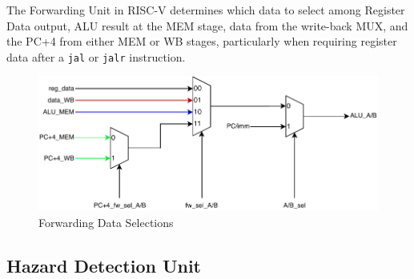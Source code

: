 \documentclass[12pt,a4paper,oneside]{book} %
\begin{document}
The Forwarding Unit in RISC-V determines which data to select among Register Data output, ALU result at the MEM stage, data from the write-back MUX, and the PC+4 from either MEM or WB stages, particularly when requiring register data after a \texttt{jal} or \texttt{jalr} instruction. 

\begin{figure}[H]
    \centering
    \includegraphics[width=.8\textwidth]{images/fw_sel.pdf}
    \caption{Forwarding Data Selections}
\end{figure}

\subsection{Hazard Detection Unit}
 
\end{document}
